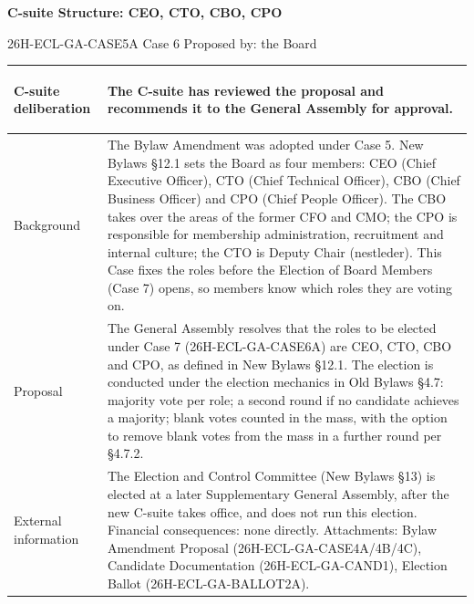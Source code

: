 \documentclass{../../../Common/Latex/Templates/rapport}
\begin{document}
\reportmainmatter
\small
\setlength{\parindent}{0pt}
\setlength{\tabcolsep}{6pt}
\renewcommand{\arraystretch}{1.2}

\begin{center}
  {\Large\bfseries C-suite Structure: CEO, CTO, CBO, CPO}\par
  \vspace{0.15cm}
  {\normalsize 26H-ECL-GA-CASE5A \textperiodcentered{} Case 6 \textperiodcentered{} Proposed by: the Board}\par
  \vspace{0.1cm}
  {\small \meetingline}\par
\end{center}

\vspace{0.3cm}
\begin{tabularx}{\textwidth}{|>{\bfseries\raggedright\arraybackslash}p{4.2cm}|X|}
  \hline
  C-suite deliberation & The C-suite has reviewed the proposal and recommends it to the General Assembly for approval. \\
  \hline
  Background           & The Bylaw Amendment was adopted under Case 5. New Bylaws \S12.1 sets the Board as four members: CEO (Chief Executive Officer), CTO (Chief Technical Officer), CBO (Chief Business Officer) and CPO (Chief People Officer). The CBO takes over the areas of the former CFO and CMO; the CPO is responsible for membership administration, recruitment and internal culture; the CTO is Deputy Chair (nestleder). This Case fixes the roles before the Election of Board Members (Case 7) opens, so members know which roles they are voting on. \\
  \hline
  Proposal             & The General Assembly resolves that the roles to be elected under Case 7 (26H-ECL-GA-CASE6A) are CEO, CTO, CBO and CPO, as defined in New Bylaws \S12.1. The election is conducted under the election mechanics in Old Bylaws \S4.7: majority vote per role; a second round if no candidate achieves a majority; blank votes counted in the mass, with the option to remove blank votes from the mass in a further round per \S4.7.2. \\
  \hline
  External information & The Election and Control Committee (New Bylaws \S13) is elected at a later Supplementary General Assembly, after the new C-suite takes office, and does not run this election. Financial consequences: none directly. Attachments: Bylaw Amendment Proposal (26H-ECL-GA-CASE4A/4B/4C), Candidate Documentation (26H-ECL-GA-CAND1), Election Ballot (26H-ECL-GA-BALLOT2A). \\
  \hline
\end{tabularx}
\end{document}
